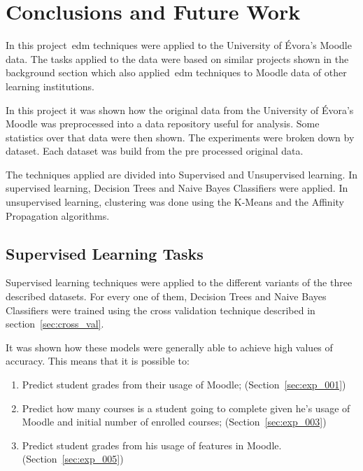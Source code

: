 \chapter{Conclusions and Future Work}
\label{sec:final}

In this project~\gls{edm} techniques were applied to the University of Évora's
Moodle data. The tasks applied to the data were based on similar projects shown
in the background section which also applied~\gls{edm} techniques to Moodle
data of other learning institutions.

In this project it was shown how the original data from the University of
Évora's Moodle was preprocessed into a data repository useful for analysis.
Some statistics over that data were then shown. The experiments were broken
down by dataset. Each dataset was build from the pre processed original data.

The techniques applied are divided into Supervised and Unsupervised learning.
In supervised learning, Decision Trees and Naive Bayes Classifiers were
applied. In unsupervised learning, clustering was done using the K-Means and
the Affinity Propagation algorithms.

\section{Supervised Learning Tasks}

Supervised learning techniques were applied to the different variants of the
three described datasets. For every one of them, Decision Trees and Naive Bayes
Classifiers were trained using the cross validation technique described in
section~\ref{sec:cross_val}.

It was shown how these models were generally able to achieve high values of
accuracy. This means that it is possible to:

\begin{enumerate}
    \item Predict student grades from their usage of Moodle;
        (Section~\ref{sec:exp_001})
    \item Predict how many courses is a student going to complete given he's
        usage of Moodle and initial number of enrolled courses;
        (Section~\ref{sec:exp_003})
    \item Predict student grades from his usage of features in Moodle.
        (Section~\ref{sec:exp_005})
\end{enumerate}

